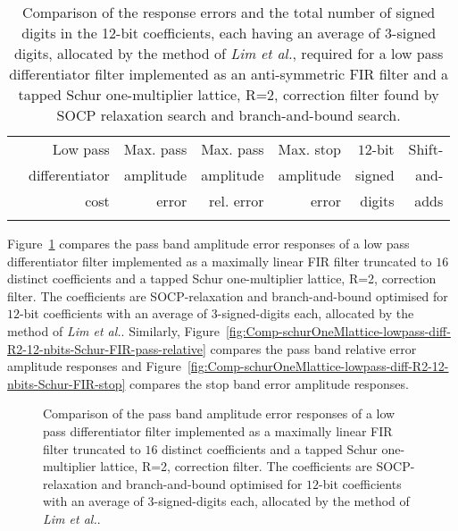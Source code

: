 \documentclass[a4paper,twoside,10pt,english]{article}
\newcommand{\DesignOfSchurLatticeFiltersPdfScale}{1}
\begin{document}
\begin{table}
\centering
\begin{threeparttable}
\begin{tabular}{lrrrrrr} \\ \toprule
 &Low pass        &Max. pass&Max. pass &Max. stop &$12$-bit&Shift-\\
 &differentiator  &amplitude&amplitude &amplitude &signed  &and- \\
 &cost            &error    &rel. error&error     &digits  &adds \\
\midrule

\\ \bottomrule
\end{tabular}
\end{threeparttable}
\caption[Comparison of low pass differentiator filter FIR and Schur lattice implementations]
{Comparison of the response errors and the total number of signed digits in the
  12-bit coefficients, each having an average of 3-signed digits, allocated by
  the method of \emph{Lim et al.}, required for a low pass differentiator filter
  implemented as an anti-symmetric FIR filter and a tapped Schur one-multiplier
  lattice, R=2, correction filter found by SOCP relaxation search and
  branch-and-bound search.}
\label{tab:Comp-schurOneMlattice-lowpass-diff-R2-12-nbits-Schur-FIR-cost}
\end{table}

Figure~\ref{fig:Comp-schurOneMlattice-lowpass-diff-R2-12-nbits-Schur-FIR-pass}
compares the pass band amplitude error responses of a low pass
differentiator filter implemented as a maximally linear FIR filter truncated to
$16$ distinct coefficients and a tapped Schur one-multiplier lattice, R=2,
correction filter. The coefficients are SOCP-relaxation and branch-and-bound
optimised for $12$-bit coefficients with an average of
$3$-signed-digits each, allocated by the method of \emph{Lim et al.}\;.
Similarly,
Figure~\ref{fig:Comp-schurOneMlattice-lowpass-diff-R2-12-nbits-Schur-FIR-pass-relative}
compares the pass band relative error amplitude responses and
Figure~\ref{fig:Comp-schurOneMlattice-lowpass-diff-R2-12-nbits-Schur-FIR-stop}
compares the stop band error amplitude responses.

\begin{figure}
\centering
\scalebox{\DesignOfSchurLatticeFiltersPdfScale}{}
\caption{Comparison of the pass band amplitude error responses of a low pass
  differentiator filter implemented as a maximally linear FIR filter truncated
  to $16$ distinct coefficients and a tapped Schur one-multiplier lattice, R=2,
  correction filter. The coefficients are SOCP-relaxation and branch-and-bound
  optimised for $12$-bit coefficients with an average of
  $3$-signed-digits each, allocated by the method of \emph{Lim et al.}\;.}
\label{fig:Comp-schurOneMlattice-lowpass-diff-R2-12-nbits-Schur-FIR-pass}
\end{figure}
\end{document}
